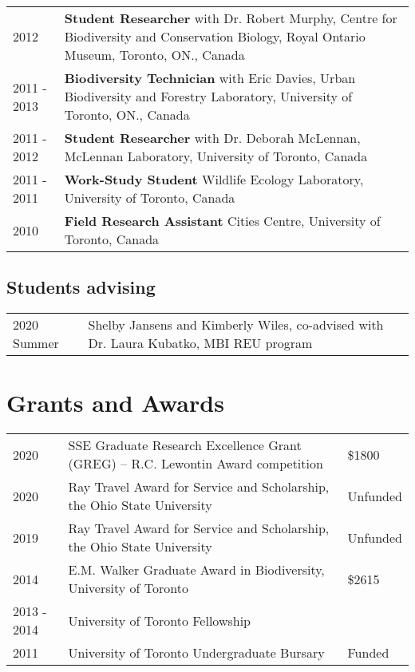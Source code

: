 \documentclass[10pt]{article}
\begin{document}
\begin{longtable}{p{}  p{}}
2012 &	\textbf{Student Researcher} with Dr. Robert Murphy, Centre for Biodiversity and Conservation Biology, Royal Ontario Museum, Toronto, ON., Canada\\
2011 - 2013 &	\textbf{Biodiversity Technician} with Eric Davies, Urban Biodiversity and Forestry Laboratory, University of Toronto, ON., Canada\\
2011 - 2012 &	\textbf{Student Researcher} with Dr. Deborah McLennan, McLennan Laboratory, University of Toronto, Canada\\
2011 - 2011&	\textbf{Work-Study Student} Wildlife Ecology Laboratory, University of Toronto, Canada\\
2010 & \textbf{Field Research Assistant} Cities Centre, University of Toronto, Canada\\

\end{longtable}

\subsection*{Students advising}

\begin{longtable}{p{}  p{}}

2020 Summer&Shelby Jansens and Kimberly Wiles, co-advised with Dr. Laura Kubatko, MBI REU program\\

\end{longtable}


\section*{Grants and Awards}

\begin{longtable}{p{}  p{} p{}}

2020 &	SSE Graduate Research Excellence Grant (GREG) – R.C. Lewontin Award competition & \$1800\\
2020 &	Ray Travel Award for Service and Scholarship, the Ohio State University & Unfunded\\
2019 &	Ray Travel Award for Service and Scholarship, the Ohio State University & Unfunded\\
2014 &	E.M. Walker Graduate Award in Biodiversity, University of Toronto & \$2615\\
2013 - 2014 & University of Toronto Fellowship &  \\
2011 &	University of Toronto Undergraduate Bursary & Funded\\

\end{longtable}
\end{document}
